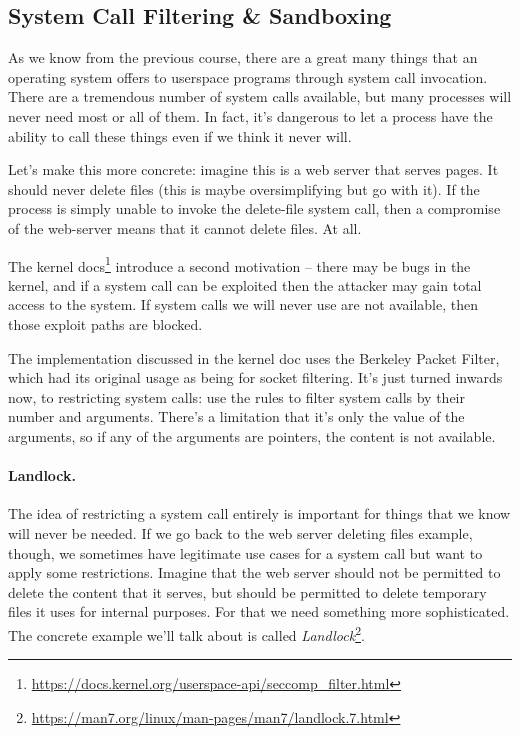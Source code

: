 \subsection*{System Call Filtering \& Sandboxing}

As we know from the previous course, there are a great many things that an operating system offers to userspace programs through system call invocation. There are a tremendous number of system calls available, but many processes will never need most or all of them. In fact, it's dangerous to let a process have the ability to call these things even if we think it never will. 

Let's make this more concrete: imagine this is a web server that serves pages. It should never delete files (this is maybe oversimplifying but go with it). If the process is simply unable to invoke the delete-file system call, then a compromise of the web-server means that it cannot delete files. At all. 

The kernel docs\footnote{ \url{https://docs.kernel.org/userspace-api/seccomp_filter.html} } introduce a second motivation -- there may be bugs in the kernel, and if a system call can be exploited then the attacker may gain total access to the system. If system calls we will never use are not available, then those exploit paths are blocked.

The implementation discussed in the kernel doc uses the Berkeley Packet Filter, which had its original usage as being for socket filtering. It's just turned inwards now, to restricting system calls: use the rules to filter system calls by their number and arguments. There's a limitation that it's only the value of the arguments, so if any of the arguments are pointers, the content is not available. 

\paragraph{Landlock.}
The idea of restricting a system call entirely is important for things that we know will never be needed. If we go back to the web server deleting files example, though, we sometimes have legitimate use cases for a system call but want to apply some restrictions. Imagine that the web server should not be permitted to delete the content that it serves, but should be permitted to delete temporary files it uses for internal purposes. For that we need something more sophisticated. The concrete example we'll talk about is called \textit{Landlock}\footnote{ \url{https://man7.org/linux/man-pages/man7/landlock.7.html}}.

